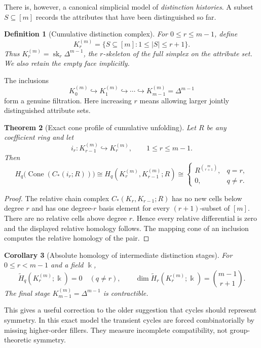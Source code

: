 \documentclass[11pt]{article}
\newtheorem{theorem}{Theorem}[section]
\newtheorem{corollary}[theorem]{Corollary}
\newtheorem{definition}[theorem]{Definition}
\newcommand{\Cone}{\operatorname{Cone}}
\newcommand{\sk}{\operatorname{sk}}
\begin{document}
There is, however, a canonical simplicial model of \emph{distinction histories}.  A subset $S\subseteq[m]$ records the attributes that have been distinguished so far.

\begin{definition}[Cumulative distinction complex]
For $0\le r\le m-1$, define
\[
K_r^{(m)}=\{S\subseteq[m]:1\le |S|\le r+1\}.
\]
Thus $K_r^{(m)}=\sk_r\Delta^{m-1}$, the $r$-skeleton of the full simplex on the attribute set.  We also retain the empty face implicitly.
\end{definition}

The inclusions
\[
K_0^{(m)}\hookrightarrow K_1^{(m)}\hookrightarrow\cdots\hookrightarrow K_{m-1}^{(m)}=\Delta^{m-1}
\]
form a genuine filtration.  Here increasing $r$ means allowing larger jointly distinguished attribute sets.

\begin{theorem}[Exact cone profile of cumulative unfolding]\label{thm:skeletoncone}
Let $R$ be any coefficient ring and let
\[
i_r:K_{r-1}^{(m)}\hookrightarrow K_r^{(m)},\qquad 1\le r\le m-1.
\]
Then
\[
H_q\bigl(\Cone(C_*(i_r;R))\bigr)
\cong H_q(K_r^{(m)},K_{r-1}^{(m)};R)
\cong
\begin{cases}
R^{\binom{m}{r+1}},&q=r,\\
0,&q\neq r.
\end{cases}
\]
\end{theorem}
\begin{proof}
The relative chain complex $C_*(K_r,K_{r-1};R)$ has no new cells below degree $r$ and has one degree-$r$ basis element for every $(r+1)$-subset of $[m]$.  There are no relative cells above degree $r$.  Hence every relative differential is zero and the displayed relative homology follows.  The mapping cone of an inclusion computes the relative homology of the pair.
\end{proof}

\begin{corollary}[Absolute homology of intermediate distinction stages]
For $0\le r<m-1$ and a field $\Bbbk$,
\[
\widetilde H_q(K_r^{(m)};\Bbbk)=0\quad(q\neq r),
\qquad
\dim\widetilde H_r(K_r^{(m)};\Bbbk)=\binom{m-1}{r+1}.
\]
The final stage $K_{m-1}^{(m)}=\Delta^{m-1}$ is contractible.
\end{corollary}

This gives a useful correction to the older suggestion that cycles should represent symmetry.  In this exact model the transient cycles are forced combinatorially by missing higher-order fillers.  They measure incomplete compatibility, not group-theoretic symmetry.
\end{document}
